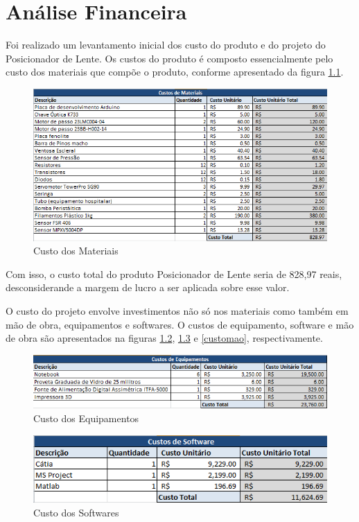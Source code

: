 \chapter[Análise Financeira]{Análise Financeira}

Foi realizado um levantamento inicial dos custo do produto e do projeto do Posicionador de Lente. Os custos do produto é composto essencialmente pelo custo dos materiais que compõe o produto, conforme apresentado da figura \ref{customateriais}.


\begin{figure}[H]
		\centering
			\includegraphics[scale=1.0]{figuras/customateriais.png}
		\caption{Custo dos Materiais}
		\label{customateriais}
\end{figure}


Com isso, o custo total do produto Posicionador de Lente seria de 828,97 reais, desconsiderande a margem de lucro a ser aplicada sobre esse valor.

O custo do projeto envolve investimentos não só nos materiais como também em mão de obra, equipamentos e softwares. O custos de equipamento, software e mão de obra são apresentados na figuras \ref{custoequip}, \ref{custosoft} e \ref{customao}, respectivamente.

\begin{figure}[H]
		\centering
			\includegraphics[scale=1.0]{figuras/custoequip.png}
		\caption{Custo dos Equipamentos}
		\label{custoequip}
\end{figure}

\begin{figure}[H]
		\centering
			\includegraphics[scale=1.0]{figuras/custosoft.png}
		\caption{Custo dos Softwares}
		\label{custosoft}
\end{figure}

